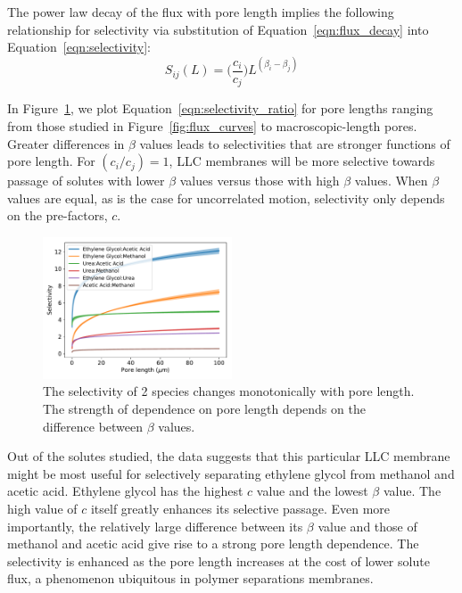 \documentclass{article}
\begin{document}
  The power law decay of the flux with pore length implies the following relationship
  for selectivity via substitution of Equation~\ref{eqn:flux_decay} into 
  Equation~\ref{eqn:selectivity}:
  \begin{equation}
  S_{ij}(L) = \bigg(\frac{c_i}{c_j}\bigg)L^{(\beta_i - \beta_j)}
  \label{eqn:selectivity_ratio}
  \end{equation}
  
  In Figure~\ref{fig:selectivity}, we plot Equation~\ref{eqn:selectivity_ratio} for pore
  lengths ranging from those studied in Figure~\ref{fig:flux_curves} to macroscopic-length
  pores. Greater differences in $\beta$ values leads to selectivities that are stronger 
  functions of pore length. For $(c_i / c_j)=1$, LLC membranes will be more selective
  towards passage of solutes with lower $\beta$ values versus those with high $\beta$ values.
  When $\beta$ values are equal, as is the case for uncorrelated motion, selectivity only
  depends on the pre-factors, $c$. 

  \begin{figure}
  \centering
  \includegraphics[width=0.5\textwidth]{selectivity.pdf}
  \caption{The selectivity of 2 species changes monotonically with pore length. The
  strength of dependence on pore length depends on the difference between $\beta$ values.}
  \label{fig:selectivity}
  \end{figure}
  
  Out of the solutes studied, the data suggests that this particular LLC membrane 
  might
  be most useful for selectively separating ethylene glycol from methanol and 
  acetic acid. 
  Ethylene glycol has the highest $c$ value and the lowest $\beta$ value. The high
  value of $c$ itself greatly enhances its selective passage. Even more importantly,
  the relatively large difference between its $\beta$ value and those of methanol 
  and acetic acid give rise to a strong pore length dependence. The selectivity is
  enhanced as the pore length increases at the cost of lower solute flux, a 
  phenomenon ubiquitous in polymer separations membranes.~\cite{geise_water_2011}
\end{document}
